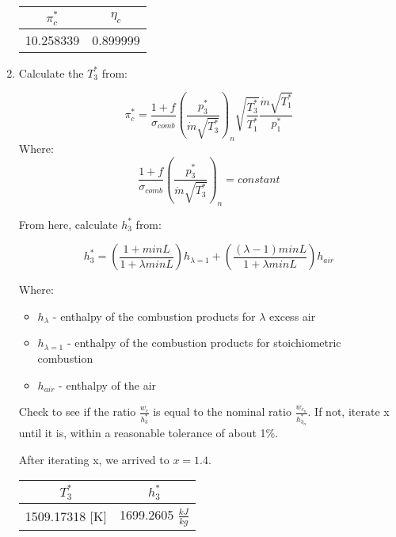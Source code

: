 \documentclass[12pt,english]{article}
\begin{document}
\begin{enumerate}
  \begin{center}
    \begin{tabular}{|c|c|}
      \hline
      $\pi_{c}^{*}$ & $\eta_{c}$ \\
      \hline
      10.258339 & 0.899999 \\
      \hline
    \end{tabular}
  \end{center}
  \item Calculate the $T_{3}^{*}$ from:
  
  \begin{equation}
    \pi_{c}^{*} = \frac{1+f}{\sigma_{comb}} \left( \frac{p_{3}^{*}}{\dot{m}\sqrt{T_{3}^{*}}} \right)_{n}
    \sqrt{\frac{T_{3}^{*}}{T_{1}^{*}}} \frac{\dot{m}\sqrt{T_{1}^{*}}}{p_{1}^{*}}
  \end{equation}
  Where:
  \begin{equation}
    \frac{1+f}{\sigma_{comb}} \left( \frac{p_{3}^{*}}{\dot{m}\sqrt{T_{3}^{*}}} \right)_{n} = constant
  \end{equation}
  
  From here, calculate $h_{3}^{*}$ from:

  \begin{equation}
    h_{3}^{*} = \left(\frac{1+minL}{1+\lambda minL}\right) h_{\lambda =1} + \left(\frac{(\lambda -1) minL}{1+\lambda minL}\right) h_{air}
  \end{equation}

  Where:
  \begin{itemize}
    \item $h_{\lambda}$ - enthalpy of the combustion products for $\lambda$ excess air
    \item $h_{\lambda =1}$ - enthalpy of the combustion products for stoichiometric combustion
    \item $h_{air}$ - enthalpy of the air
  \end{itemize}

  Check to see if the ratio $\frac{w_{c}}{h_{3}^{*}}$ is equal to the nominal ratio
  $\frac{w_{c_{n}}}{h_{3_{n}}^{*}}$. If not, iterate x until it is, within a reasonable tolerance of about 1\%.

  \vspace{0.5cm}

  After iterating x, we arrived to $x = 1.4$.

  \begin{center}
    \begin{tabular}{|c|c|}
      \hline
      $T_{3}^{*}$ & $h_{3}^{*}$ \\
      \hline
      1509.17318 [K] & 1699.2605 $\frac{kJ}{kg}$ \\
      \hline
    \end{tabular}
  \end{center}


\end{enumerate}
\end{document}
